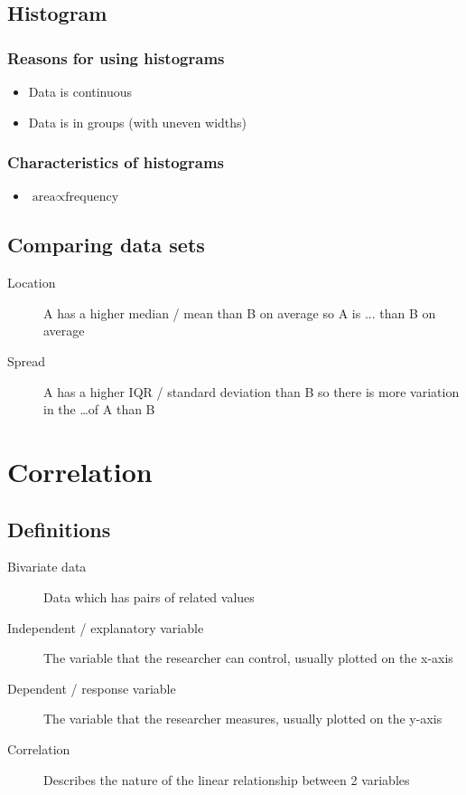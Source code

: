 \documentclass[fleqn, 11pt]{article}
\begin{document}
	
	\subsection{Histogram}
	\subsubsection{Reasons for using histograms}
	\begin{itemize}
		\item Data is continuous
		\item Data is in groups (with uneven widths)
	\end{itemize}
	\subsubsection{Characteristics of histograms}
	\begin{itemize}
		\item $\text{area}\propto\text{frequency}$
	\end{itemize}
	
	\subsection{Comparing data sets}
	\begin{description}
		\item[Location] A has a higher median / mean than B on average so A is ... than B on average
		\item[Spread] A has a higher IQR / standard deviation than B so there is more variation in the \dots of A than B
	\end{description}
	
	
	
	\pagebreak
	
	
	\section{Correlation}
	\subsection{Definitions}
	\begin{description}
		\item[Bivariate data] Data which has pairs of related values
		\item[Independent / explanatory variable] The variable that the researcher can control, usually plotted on the x-axis
		\item[Dependent / response variable] The variable that the researcher measures, usually plotted on the y-axis
		\item[Correlation] Describes the nature of the linear relationship between 2 variables
	\end{description}
	
\end{document}
